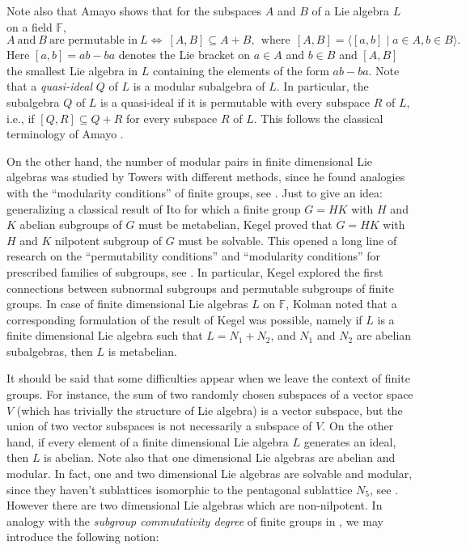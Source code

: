 \documentclass{amsart}
\theoremstyle{definition}
\numberwithin{equation}{section}
\begin{document}
Note also that Amayo \cite{amayo1976} shows that for  the subspaces $A$ and $B$  of a Lie algebra $L$ on a field $\mathbb{F}$,   
\[A \ 
 \mbox{and} \ B \ \mbox{are permutable in} \ L \Longleftrightarrow \  [A,B]\subseteq A+B, \ \ \mbox{where}\ \ [A,B]=\langle [a,b] \mid a\in A, b\in B\rangle.\]
 Here $[a,b]=ab-ba$ denotes the Lie bracket on $a \in A$ and $b\in B$ and $[A,B]$  the smallest Lie algebra in $L$ containing the elements of the form $ab-ba$.
Note that a \textit{quasi-ideal} $Q$ of $L$ is a modular subalgebra of  $L$. In particular,  the subalgebra $Q$ of $L$ is a quasi-ideal if it is permutable with every subspace $R$ of $L$, i.e., if $[Q, R]\subseteq Q+R$ for every subspace $R$ of $ L$. This follows the classical terminology of Amayo \cite{amayo1976,amayo1976II}. 



On the other hand,  the number of modular pairs in finite dimensional Lie algebras was studied  by Towers \cite{david1981} with different methods, since he found analogies with the ``modularity conditions'' of finite groups, see \cite{rs}. Just to give an idea: generalizing a classical result of Ito \cite{rs} for which a finite group $G=HK$ with $H$ and $K$ abelian subgroups of $G$ must be metabelian,  Kegel \cite{kegel1} proved that  $G=HK$ with $H$ and $K$ nilpotent subgroup of $G$ must be solvable. This opened a long line of research on the ``permutability conditions'' and ``modularity conditions'' for prescribed families of subgroups, see \cite{hhr, lenston, rs}. In particular, Kegel \cite{kegel2} explored the first connections  between subnormal subgroups and permutable subgroups of finite groups. In case of finite dimensional Lie algebras $L$ on  $\mathbb{F}$, Kolman \cite{kolman1965} noted that a corresponding formulation of the result of Kegel was possible, namely if
 $L$ is a finite dimensional Lie algebra such that $L = N_1+N_2$, and $N_1$ and $N_2$ are abelian subalgebras, then   $L$ is metabelian.   
 
 
It should be said that some difficulties appear when we leave the context of finite groups. For instance, the sum of two randomly chosen subspaces of a vector space $V$ (which has trivially the structure of Lie algebra) is  a vector subspace, but the union of two vector subspaces is not necessarily  a subspace of $V$. On the other hand,  if every element of a finite dimensional Lie algebra $L$ generates an ideal, then $L$ is abelian.  Note also that  one dimensional Lie algebras are abelian and modular.  In fact,  one  and  two dimensional Lie algebras are  solvable and modular, since they haven't  sublattices isomorphic to the pentagonal sublattice $N_5$, see \cite{lenston, rs}. However there are two dimensional Lie algebras which are non-nilpotent.  In analogy with the \textit{subgroup commutativity degree} of finite groups in  \cite{farrokhi2, sr1, sr2, or,  mt}, we may introduce the following notion:
\end{document}
